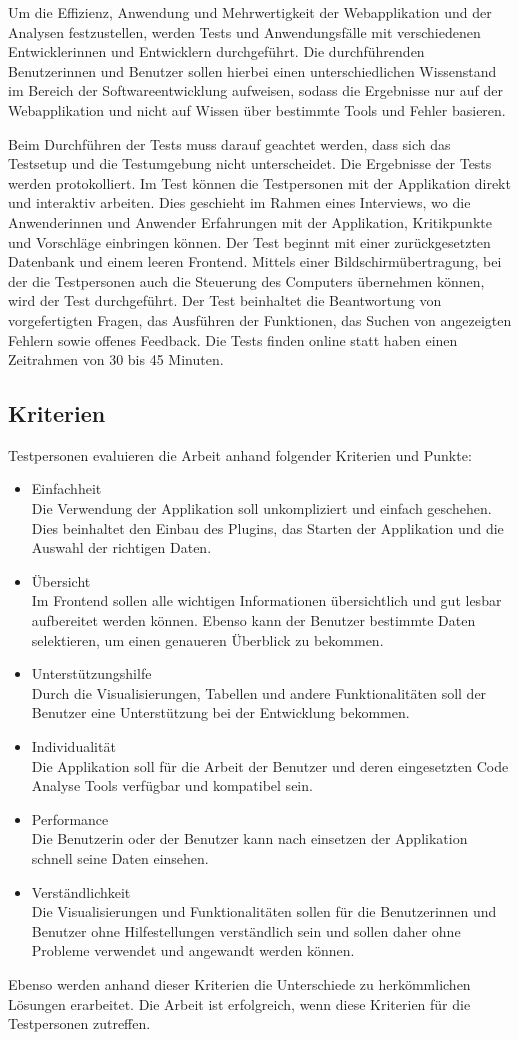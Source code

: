 Um die Effizienz, Anwendung und Mehrwertigkeit der Webapplikation und der Analysen festzustellen, werden Tests und Anwendungsfälle mit verschiedenen Entwicklerinnen und Entwicklern durchgeführt. Die durchführenden Benutzerinnen und Benutzer sollen hierbei einen unterschiedlichen Wissenstand im Bereich der Softwareentwicklung aufweisen, sodass die Ergebnisse nur auf der Webapplikation und nicht auf Wissen über bestimmte Tools und Fehler basieren. 


Beim Durchführen der Tests muss darauf geachtet werden, dass sich das Testsetup und die Testumgebung nicht unterscheidet. Die Ergebnisse der Tests werden protokolliert. Im Test können die Testpersonen mit der Applikation direkt und interaktiv arbeiten. Dies geschieht im Rahmen eines Interviews, wo die Anwenderinnen und Anwender Erfahrungen mit der Applikation, Kritikpunkte und Vorschläge einbringen können. Der Test beginnt mit einer zurückgesetzten Datenbank und einem leeren Frontend. Mittels einer Bildschirmübertragung, bei der die Testpersonen auch die Steuerung des Computers übernehmen können, wird der Test durchgeführt.
Der Test beinhaltet die Beantwortung von vorgefertigten Fragen, das Ausführen der Funktionen, das Suchen von angezeigten Fehlern sowie offenes Feedback.
Die Tests finden online statt haben einen Zeitrahmen von 30 bis 45 Minuten. 
\subsection{Kriterien} 
Testpersonen evaluieren die Arbeit anhand folgender Kriterien und Punkte:
\begin{itemize}
\item Einfachheit \\ Die Verwendung der Applikation soll unkompliziert und einfach geschehen. Dies beinhaltet den Einbau des Plugins, das Starten der Applikation und die Auswahl der richtigen Daten.
\item Übersicht \\ Im Frontend sollen alle wichtigen Informationen übersichtlich und gut lesbar aufbereitet werden können. Ebenso kann der Benutzer bestimmte Daten selektieren, um einen genaueren Überblick zu bekommen.
\item Unterstützungshilfe \\ Durch die Visualisierungen, Tabellen und andere Funktionalitäten soll der Benutzer eine Unterstützung bei der Entwicklung bekommen.
\item Individualität \\ Die Applikation soll für die Arbeit der Benutzer und deren eingesetzten Code Analyse Tools verfügbar und kompatibel sein. 
\item Performance \\ Die Benutzerin oder der Benutzer kann nach einsetzen der Applikation schnell seine Daten einsehen.
\item Verständlichkeit \\ Die Visualisierungen und Funktionalitäten sollen für die Benutzerinnen und Benutzer ohne Hilfestellungen verständlich sein und sollen daher ohne Probleme verwendet und angewandt werden können.
\end{itemize}

Ebenso werden anhand dieser Kriterien die Unterschiede zu herkömmlichen Lösungen erarbeitet. Die Arbeit ist erfolgreich, wenn diese Kriterien für die Testpersonen zutreffen. 

